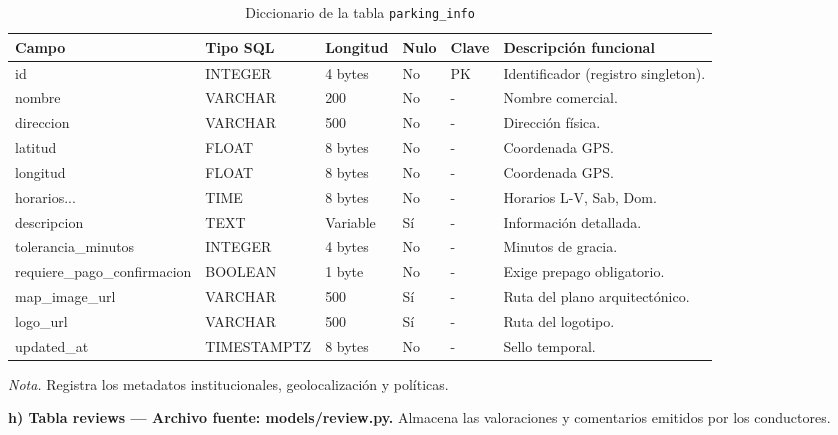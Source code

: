 \begin{table}[htbp]
\caption{Diccionario de la tabla \texttt{parking\_info}}
\label{tab:dict_parking_info}
\begin{tabular}{@{}p{5.5cm} p{3cm} p{1.5cm} p{1cm} p{1.5cm} p{3cm}@{}}
\toprule
\textbf{Campo} & \textbf{Tipo SQL} & \textbf{Longitud} & \textbf{Nulo} & \textbf{Clave} & \textbf{Descripción funcional} \\
\midrule
id & INTEGER & 4 bytes & No & PK & Identificador (registro singleton). \\
nombre & VARCHAR & 200 & No & - & Nombre comercial. \\
direccion & VARCHAR & 500 & No & - & Dirección física. \\
latitud & FLOAT & 8 bytes & No & - & Coordenada GPS. \\
longitud & FLOAT & 8 bytes & No & - & Coordenada GPS. \\
horarios... & TIME & 8 bytes & No & - & Horarios L-V, Sab, Dom. \\
descripcion & TEXT & Variable & Sí & - & Información detallada. \\
tolerancia\_minutos & INTEGER & 4 bytes & No & - & Minutos de gracia. \\
requiere\_pago\_confirmacion & BOOLEAN & 1 byte & No & - & Exige prepago obligatorio. \\
map\_image\_url & VARCHAR & 500 & Sí & - & Ruta del plano arquitectónico. \\
logo\_url & VARCHAR & 500 & Sí & - & Ruta del logotipo. \\
updated\_at & TIMESTAMPTZ & 8 bytes & No & - & Sello temporal. \\
\bottomrule
\end{tabular}
\par\vspace{0.2cm}
\textit{Nota.} Registra los metadatos institucionales, geolocalización y políticas.
\end{table}

\textbf{h) Tabla reviews — Archivo fuente: models/review.py.} Almacena las valoraciones y comentarios emitidos por los conductores.

